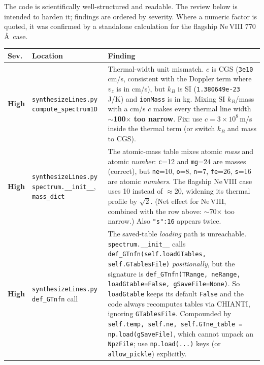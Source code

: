 \documentclass[11pt]{article}
\newcommand{\code}[1]{\texttt{#1}}
\begin{document}
The code is scientifically well-structured and readable. The review below is
intended to harden it; findings are ordered by severity. Where a numeric factor
is quoted, it was confirmed by a standalone calculation for the flagship
Ne\,VIII 770\,\AA\ case.

\newcommand{\sev}[2]{\textcolor{#1}{\textbf{#2}}}

\begin{center}
\small
\begin{tabular}{@{}p{1.4cm}p{3.2cm}p{10.0cm}@{}}
\toprule
\textbf{Sev.} & \textbf{Location} & \textbf{Finding} \\
\midrule

\sev{sevhigh}{High} & \code{synthesizeLines.py} \newline \code{compute\_spectrum1D} &
Thermal-width unit mismatch. $c$ is CGS (\code{3e10} cm/s, consistent with the
Doppler term where $v_z$ is in cm/s), but $k_B$ is SI (\code{1.380649e-23} J/K)
and \code{ionMass} is in kg. Mixing SI $k_B$/mass with a cm/s $c$ makes every
thermal line width \textbf{$\sim$100$\times$ too narrow}. Fix: use $c=3\times10^{8}$\,m/s
inside the thermal term (or switch $k_B$ and mass to CGS). \\

\addlinespace
\sev{sevhigh}{High} & \code{synthesizeLines.py} \newline \code{spectrum.\_\_init\_\_}, \code{mass\_dict} &
The atomic-mass table mixes atomic \emph{mass} and atomic \emph{number}:
\code{c}=12 and \code{mg}=24 are masses (correct), but \code{ne}=10, \code{o}=8,
\code{n}=7, \code{fe}=26, \code{s}=16 are atomic \emph{numbers}. The flagship
Ne\,VIII case uses 10 instead of $\approx$20, widening its thermal profile by
$\sqrt{2}$. (Net effect for Ne\,VIII, combined with the row above:
$\sim$70$\times$ too narrow.) Also \code{"s":16} appears twice. \\

\addlinespace
\sev{sevhigh}{High} & \code{synthesizeLines.py} \newline \code{def\_GTnfn} call &
The saved-table \emph{loading} path is unreachable. \code{spectrum.\_\_init\_\_}
calls \code{def\_GTnfn(self.loadGTables, self.GTablesFile)} \emph{positionally},
but the signature is \code{def\_GTnfn(TRange, neRange, loadGtable=False,
gSaveFile=None)}. So \code{loadGtable} keeps its default \code{False} and the
code always recomputes tables via CHIANTI, ignoring \code{GTablesFile}. Compounded
by \code{self.temp, self.ne, self.GTne\_table = np.load(gSaveFile)}, which cannot
unpack an \code{NpzFile}; use \code{np.load(...)} keys (or \code{allow\_pickle})
explicitly. \\


\end{tabular}
\end{center}
\end{document}

